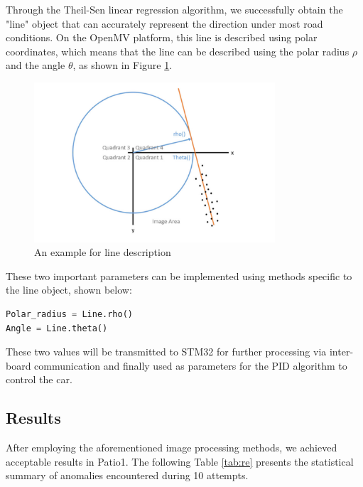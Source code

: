 \documentclass[12pt, a4paper, oneside]{report}
\begin{document}
Through the Theil-Sen linear regression algorithm, we successfully obtain the "line" object that can accurately represent the direction under most road conditions. On the OpenMV platform, this line is described using polar coordinates, which means that the line can be described using the polar radius $\rho$ and the angle $\theta$, as shown in Figure \ref{fig:line}. 

\begin{figure}[H]
  \centering
  \includegraphics[width=0.8\textwidth]{pic/Tracing/Line.jpg}
  \caption{An example for line description \cite{AGYEMAN_2017}}
  \label{fig:line}
\end{figure}

These two important parameters can be implemented using methods specific to the line object, shown below:


\begin{lstlisting}[language=Python]
Polar_radius = Line.rho()
Angle = Line.theta()
\end{lstlisting}



These two values will be transmitted to STM32 for further processing via inter-board communication and finally used as parameters for the PID algorithm to control the car.
\subsection{Results}
After employing the aforementioned image processing methods, we achieved acceptable results in Patio1. The following Table \ref{tab:re} presents the statistical summary of anomalies encountered during 10 attempts.
\end{document}
